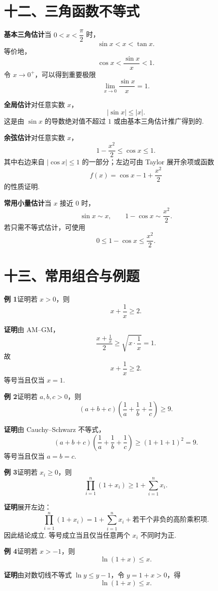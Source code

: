 \documentclass[UTF8, 12pt, fontset=fandol, oneside]{ctexart}
\begin{document}
\section*{十二、三角函数不等式}

\noindent\textbf{基本三角估计}\quad 当 $0<x<\dfrac{\pi}{2}$ 时，
\[
  \sin x<x<\tan x.
\]
等价地，
\[
  \cos x<\frac{\sin x}{x}<1.
\]
令 $x\to0^+$，可以得到重要极限
\[
  \lim_{x\to0}\frac{\sin x}{x}=1.
\]

\noindent\textbf{全局估计}\quad 对任意实数 $x$，
\[
  |\sin x|\le |x|.
\]
这是由 $\sin x$ 的导数绝对值不超过 $1$ 或由基本三角估计推广得到的.

\noindent\textbf{余弦估计}\quad 对任意实数 $x$，
\[
  1-\frac{x^2}{2}\le \cos x\le1.
\]
其中右边来自 $|\cos x|\le1$ 的一部分；左边可由 Taylor 展开余项或函数
\[
  f(x)=\cos x-1+\frac{x^2}{2}
\]
的性质证明.

\noindent\textbf{常用小量估计}\quad 当 $x$ 接近 $0$ 时，
\[
  \sin x\sim x,\qquad 1-\cos x\sim \frac{x^2}{2}.
\]
若只需不等式估计，可使用
\[
  0\le1-\cos x\le\frac{x^2}{2}.
\]

\section*{十三、常用组合与例题}

\noindent\textbf{例 1}\quad 证明若 $x>0$，则
\[
  x+\frac1x\ge2.
\]

\noindent\textbf{证明}\quad 由 AM--GM，
\[
  \frac{x+\frac1x}{2}\ge \sqrt{x\cdot\frac1x}=1.
\]
故
\[
  x+\frac1x\ge2.
\]
等号当且仅当 $x=1$.

\noindent\textbf{例 2}\quad 证明若 $a,b,c>0$，则
\[
  (a+b+c)\left(\frac1a+\frac1b+\frac1c\right)\ge9.
\]

\noindent\textbf{证明}\quad 由 Cauchy--Schwarz 不等式，
\[
  (a+b+c)\left(\frac1a+\frac1b+\frac1c\right)
  \ge
  (1+1+1)^2=9.
\]
等号当且仅当 $a=b=c$.

\noindent\textbf{例 3}\quad 证明若 $x_i\ge0$，则
\[
  \prod_{i=1}^n (1+x_i)
  \ge
  1+\sum_{i=1}^n x_i.
\]

\noindent\textbf{证明}\quad 展开左边：
\[
  \prod_{i=1}^n(1+x_i)
  =
  1+\sum_{i=1}^n x_i+\text{若干个非负的高阶乘积项}.
\]
因此结论成立. 等号成立当且仅当任意两个 $x_i$ 不同时为正.

\noindent\textbf{例 4}\quad 证明若 $x>-1$，则
\[
  \ln(1+x)\le x.
\]

\noindent\textbf{证明}\quad 由对数切线不等式 $\ln y\le y-1$，令 $y=1+x>0$，得
\[
  \ln(1+x)\le x.
\]
\end{document}
